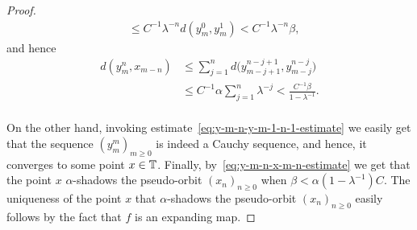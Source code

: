 \begin{proof}
\begin{equation}
\begin{split}
                                     &\leq C^{-1}\lambda^{-n} d(y_m^0,y_m^1) < C^{-1}\lambda^{-n}\beta,
    \end{split}
  \end{equation}
  and hence
  \begin{equation}
    \label{eq:y-m-n-x-m-n-estimate}
    \begin{split}
      d(y_m^n,x_{m-n})  &\leq \sum_{j=1}^{n} d\big(y_{m-j+1}^{n-j+1},y_{m-j}^{n-j}\big)\\
                        &\leq  C^{-1}\alpha\sum_{j=1}^{n}\lambda^{-j} < \frac{C^{-1}\beta}{1-\lambda^{-1}}. \\
    \end{split}
  \end{equation}

  On the other hand, invoking estimate~\eqref{eq:y-m-n-y-m-1-n-1-estimate} we easily get that the sequence $(y_m^m)_{m\geq 0}$ is indeed a Cauchy sequence, and hence, it converges to some point $x\in\mathbb{T}$. Finally, by~\eqref{eq:y-m-n-x-m-n-estimate} we get that the point $x$ $\alpha$-shadows the pseudo-orbit $(x_n)_{n\geq 0}$ when $\beta<\alpha(1-\lambda^{-1})C$. The uniqueness of the point $x$ that $\alpha$-shadows the pseudo-orbit $(x_n)_{n\geq 0}$ easily follows by the fact that $f$ is an expanding map.
\end{proof}
